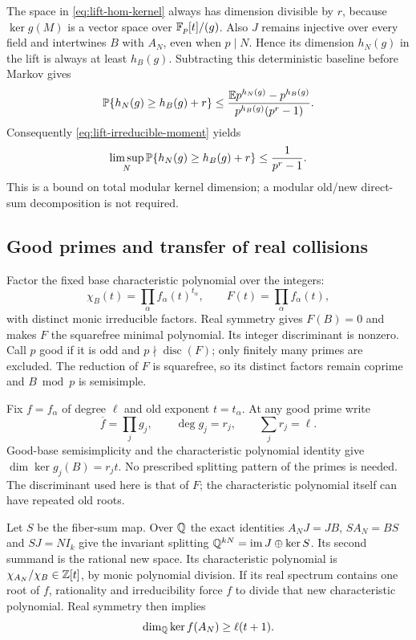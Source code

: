 The space in \eqref{eq:lift-hom-kernel} always has dimension divisible
by $r$, because $\ker g(M)$ is a vector space over $\mathbb F_p[t]/(g)$.
Also $J$ remains injective over every field and intertwines $B$ with
$A_N$, even when $p\mid N$. Hence its dimension $h_N(g)$ in the
lift is always at least $h_B(g)$. Subtracting this deterministic
baseline before Markov gives
\[
 \mathbb P\{h_N(g)\ge h_B(g)+r\}
 \le\frac{\mathbb E p^{h_N(g)}-p^{h_B(g)}}
              {p^{h_B(g)}(p^r-1)}.
\]
Consequently \eqref{eq:lift-irreducible-moment} yields
\begin{equation}\label{eq:lift-shifted-markov}
 \limsup_N\mathbb P\{h_N(g)\ge h_B(g)+r\}
 \le\frac1{p^r-1}.
\end{equation}
This is a bound on total modular kernel dimension; a modular old/new
direct-sum decomposition is not required.

\subsection{Good primes and transfer of real collisions}
Factor the fixed base characteristic polynomial over the integers:
\[
 \chi_B(t)=\prod_\alpha f_\alpha(t)^{t_\alpha},\qquad
 F(t)=\prod_\alpha f_\alpha(t),
\]
with distinct monic irreducible factors. Real symmetry gives
$F(B)=0$ and makes $F$ the squarefree minimal polynomial.
Its integer discriminant is nonzero. Call $p$ good if it is odd
and $p\nmid\operatorname{disc}(F)$; only finitely many primes are
excluded. The reduction of $F$ is squarefree, so its distinct
factors remain coprime and $B\bmod p$ is semisimple.

Fix $f=f_\alpha$ of degree $\ell$ and old exponent $t=t_\alpha$.
At any good prime write
\[
 \overline f=\prod_j g_j,\qquad \deg g_j=r_j,\qquad
 \sum_jr_j=\ell.
\]
Good-base semisimplicity and the characteristic polynomial identity
give $\dim\ker g_j(B)=r_jt$. No prescribed splitting pattern of
the primes is needed. The discriminant used here is that of $F$;
the characteristic polynomial itself can have repeated old roots.

Let $S$ be the fiber-sum map. Over $\mathbb Q$ the exact identities
$A_NJ=JB$, $SA_N=BS$ and $SJ=NI_k$ give the invariant splitting
$\mathbb Q^{kN}=\operatorname{im} J\oplus\ker S$. Its second summand is the rational
new space. Its characteristic polynomial is
$\chi_{A_N}/\chi_B\in\mathbb Z[t]$, by monic polynomial division.
If its real spectrum contains one root of $f$, rationality and
irreducibility force $f$ to divide that new characteristic polynomial.
Real symmetry then implies
\begin{equation}\label{eq:lift-real-polynomial-nullity}
 \dim_\mathbb Q\ker f(A_N)\ge\ell(t+1).
\end{equation}

